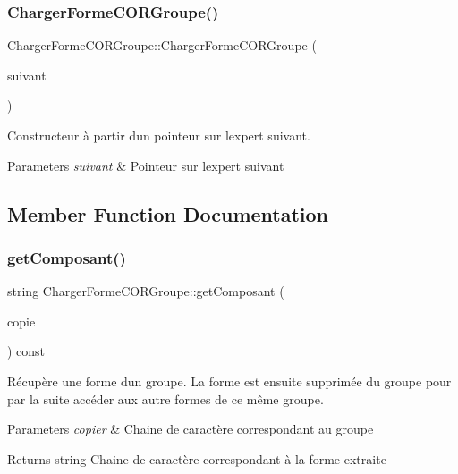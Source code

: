 \subsubsection{\texorpdfstring{Charger\+Forme\+C\+O\+R\+Groupe()}{ChargerFormeCORGroupe()}}
{\footnotesize\ttfamily Charger\+Forme\+C\+O\+R\+Groupe\+::\+Charger\+Forme\+C\+O\+R\+Groupe (\begin{DoxyParamCaption}\item[{\hyperlink{class_charger_forme_c_o_r}{Charger\+Forme\+C\+OR} $\ast$}]{suivant }\end{DoxyParamCaption})}



Constructeur à partir d\textquotesingle{}un pointeur sur l\textquotesingle{}expert suivant. 


\begin{DoxyParams}{Parameters}
{\em suivant} & Pointeur sur l\textquotesingle{}expert suivant \\
\hline
\end{DoxyParams}


\subsection{Member Function Documentation}
\mbox{\label{class_charger_forme_c_o_r_groupe_a6a9f6502bd3d05670a69c8eca418ce06}} 
\subsubsection{\texorpdfstring{get\+Composant()}{getComposant()}}
{\footnotesize\ttfamily string Charger\+Forme\+C\+O\+R\+Groupe\+::get\+Composant (\begin{DoxyParamCaption}\item[{string \&}]{copie }\end{DoxyParamCaption}) const}



Récupère une forme d\textquotesingle{}un groupe. La forme est ensuite supprimée du groupe pour par la suite accéder aux autre formes de ce même groupe. 


\begin{DoxyParams}{Parameters}
{\em copier} & Chaine de caractère correspondant au groupe \\
\hline
\end{DoxyParams}
\begin{DoxyReturn}{Returns}
string Chaine de caractère correspondant à la forme extraite 
\end{DoxyReturn}
\mbox{\label{class_charger_forme_c_o_r_groupe_a202dfd1ec95bc7a20daeb66a92452a11}} 
